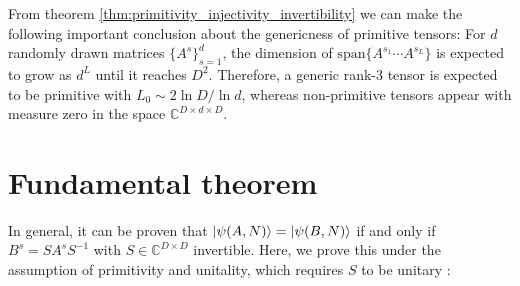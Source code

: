 \noindent From theorem \ref{thm:primitivity_injectivity_invertibility} we can make the following important conclusion about the genericness of primitive tensors: For $d$ randomly drawn matrices $\{A^s\}_{s=1}^d$, the dimension of $\mathrm{span}\{A^{s_1} \cdots A^{s_L}\}$ is expected to grow as $d^L$ until it reaches $D^2$. Therefore, a generic rank-3 tensor is expected to be primitive with $L_0 \sim 2 \ln D / \ln d$, whereas non-primitive tensors appear with measure zero in the space $\mathbb{C}^{D \times d \times D}$. \cite{perez2007matrix} \\


\newpage
\section*{Fundamental theorem}
In general, it can be proven that $\ket{\psi(A,N)} = \ket{\psi(B,N)}$ if and only if $B^s = S A^s S^{-1}$ with $S \in \mathbb{C}^{D \times D}$ invertible. Here, we prove this under the assumption of primitivity and unitality, which requires $S$ to be unitary \cite{cirac2017matrix}:

